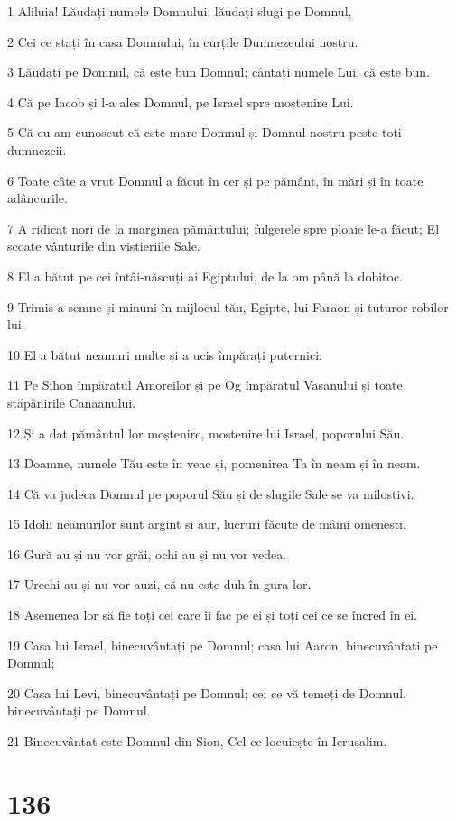 \par 1 Aliluia! Lăudați numele Domnului, lăudați slugi pe Domnul,
\par 2 Cei ce stați în casa Domnului, în curțile Dumnezeului nostru.
\par 3 Lăudați pe Domnul, că este bun Domnul; cântați numele Lui, că este bun.
\par 4 Că pe Iacob și l-a ales Domnul, pe Israel spre moștenire Lui.
\par 5 Că eu am cunoscut că este mare Domnul și Domnul nostru peste toți dumnezeii.
\par 6 Toate câte a vrut Domnul a făcut în cer și pe pământ, în mări și în toate adâncurile.
\par 7 A ridicat nori de la marginea pământului; fulgerele spre ploaie le-a făcut; El scoate vânturile din vistieriile Sale.
\par 8 El a bătut pe cei întâi-născuți ai Egiptului, de la om până la dobitoc.
\par 9 Trimis-a semne și minuni în mijlocul tău, Egipte, lui Faraon și tuturor robilor lui.
\par 10 El a bătut neamuri multe și a ucis împărați puternici:
\par 11 Pe Sihon împăratul Amoreilor și pe Og împăratul Vasanului și toate stăpânirile Canaanului.
\par 12 Și a dat pământul lor moștenire, moștenire lui Israel, poporului Său.
\par 13 Doamne, numele Tău este în veac și, pomenirea Ta în neam și în neam.
\par 14 Că va judeca Domnul pe poporul Său și de slugile Sale se va milostivi.
\par 15 Idolii neamurilor sunt argint și aur, lucruri făcute de mâini omenești.
\par 16 Gură au și nu vor grăi, ochi au și nu vor vedea.
\par 17 Urechi au și nu vor auzi, că nu este duh în gura lor.
\par 18 Asemenea lor să fie toți cei care îi fac pe ei și toți cei ce se încred în ei.
\par 19 Casa lui Israel, binecuvântați pe Domnul; casa lui Aaron, binecuvântați pe Domnul;
\par 20 Casa lui Levi, binecuvântați pe Domnul; cei ce vă temeți de Domnul, binecuvântați pe Domnul.
\par 21 Binecuvântat este Domnul din Sion, Cel ce locuiește în Ierusalim.

\chapter{136}

